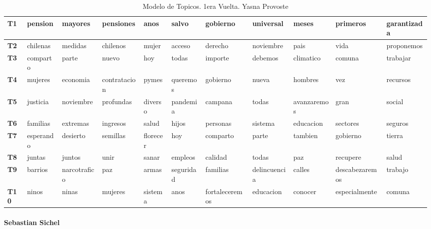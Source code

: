 \documentclass[
  10pt,
  letterpaper,
]{report}
\begin{document}
\begin{table}[!h]

\caption{\label{tab:Tabla4_yasna}Modelo de Topicos. 1era Vuelta. Yasna Provoste}
\centering
\fontsize{6}{8}\selectfont
\begin{tabular}[t]{>{\raggedright\arraybackslash}p{0.08in}|>{\raggedright\arraybackslash}p{0.4in}|>{\raggedright\arraybackslash}p{0.4in}|>{\raggedright\arraybackslash}p{0.4in}|>{\raggedright\arraybackslash}p{0.4in}|>{\raggedright\arraybackslash}p{0.4in}|>{\raggedright\arraybackslash}p{0.4in}|>{\raggedright\arraybackslash}p{0.4in}|>{\raggedright\arraybackslash}p{0.4in}|>{\raggedright\arraybackslash}p{0.4in}|l}
\hline
T1 & pension & mayores & pensiones & anos & salvo & gobierno & universal & meses & primeros & garantizada\\
\hline
\textbf{T2} & chilenas & medidas & chilenos & mujer & acceso & derecho & noviembre & pais & vida & proponemos\\
\hline
\textbf{T3} & comparto & parte & nuevo & hoy & todas & importe & debemos & climatico & comuna & trabajar\\
\hline
\textbf{T4} & mujeres & economia & contratacion & pymes & queremos & gobierno & nueva & hombres & vez & recursos\\
\hline
\textbf{T5} & justicia & noviembre & profundas & diverso & pandemia & campana & todas & avanzaremos & gran & social\\
\hline
\textbf{T6} & familias & extremas & ingresos & salud & hijos & personas & sistema & educacion & sectores & seguros\\
\hline
\textbf{T7} & esperando & desierto & semillas & florecer & hoy & comparto & parte & tambien & gobierno & tierra\\
\hline
\textbf{T8} & juntas & juntos & unir & sanar & empleos & calidad & todas & paz & recupere & salud\\
\hline
\textbf{T9} & barrios & narcotrafico & paz & armas & seguridad & familias & delincuencia & calles & descabezaremos & trabajo\\
\hline
\textbf{T10} & ninos & ninas & mujeres & sistema & anos & fortaleceremos & educacion & conocer & especialmente & comuna\\
\hline
\end{tabular}
\end{table}

\hypertarget{sebastian-sichel}{%
\paragraph{Sebastian Sichel}\label{sebastian-sichel}}
\end{document}
